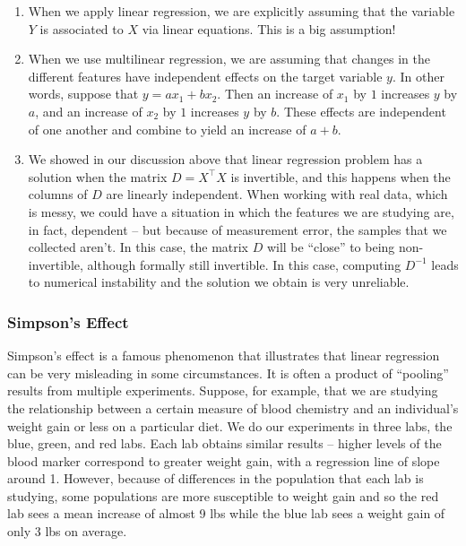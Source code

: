 \documentclass[]{article}
\begin{document}
\begin{enumerate}
\def\labelenumi{\arabic{enumi}.}
\item
  When we apply linear regression, we are explicitly assuming that the
  variable \(Y\) is associated to \(X\) via linear equations. This is a
  big assumption!
\item
  When we use multilinear regression, we are assuming that changes in
  the different features have independent effects on the target variable
  \(y\). In other words, suppose that \(y=ax_1+bx_2\). Then an increase
  of \(x_1\) by \(1\) increases \(y\) by \(a\), and an increase of
  \(x_2\) by \(1\) increases \(y\) by \(b\). These effects are
  independent of one another and combine to yield an increase of
  \(a+b\).
\item
  We showed in our discussion above that linear regression problem has a
  solution when the matrix \(D=X^{\intercal}X\) is invertible, and this
  happens when the columns of \(D\) are linearly independent. When
  working with real data, which is messy, we could have a situation in
  which the features we are studying are, in fact, dependent -- but
  because of measurement error, the samples that we collected aren't. In
  this case, the matrix \(D\) will be ``close'' to being non-invertible,
  although formally still invertible. In this case, computing \(D^{-1}\)
  leads to numerical instability and the solution we obtain is very
  unreliable.
\end{enumerate}

\hypertarget{simpsons-effect}{%
\subsubsection{Simpson's Effect}\label{simpsons-effect}}

Simpson's effect is a famous phenomenon that illustrates that linear
regression can be very misleading in some circumstances. It is often a
product of ``pooling'' results from multiple experiments. Suppose, for
example, that we are studying the relationship between a certain measure
of blood chemistry and an individual's weight gain or less on a
particular diet. We do our experiments in three labs, the blue, green,
and red labs. Each lab obtains similar results -- higher levels of the
blood marker correspond to greater weight gain, with a regression line
of slope around 1. However, because of differences in the population
that each lab is studying, some populations are more susceptible to
weight gain and so the red lab sees a mean increase of almost 9 lbs
while the blue lab sees a weight gain of only 3 lbs on average.
\end{document}
